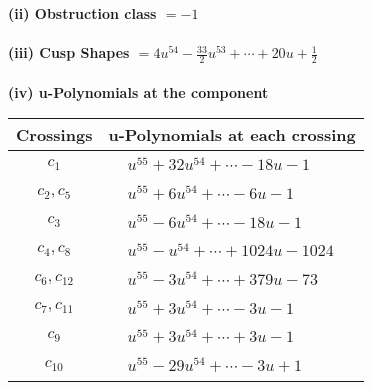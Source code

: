 \documentclass[1p]{elsarticle_modified}
\theoremstyle{definition}
\begin{document}
\flushleft \textbf{(ii) Obstruction class $= -1$}\\~\\
\flushleft \textbf{(iii) Cusp Shapes $= 4 u^{54}-\frac{33}{2} u^{53}+\cdots+20 u+\frac{1}{2}$}\\~\\
\newpage\renewcommand{\arraystretch}{1}
\flushleft \textbf{(iv) u-Polynomials at the component}\newline \\
\begin{tabular}{m{50pt}|m{274pt}}
Crossings & \hspace{64pt}u-Polynomials at each crossing \\
\hline $$\begin{aligned}c_{1}\end{aligned}$$&$\begin{aligned}
&u^{55}+32 u^{54}+\cdots-18 u-1
\end{aligned}$\\
\hline $$\begin{aligned}c_{2},c_{5}\end{aligned}$$&$\begin{aligned}
&u^{55}+6 u^{54}+\cdots-6 u-1
\end{aligned}$\\
\hline $$\begin{aligned}c_{3}\end{aligned}$$&$\begin{aligned}
&u^{55}-6 u^{54}+\cdots-18 u-1
\end{aligned}$\\
\hline $$\begin{aligned}c_{4},c_{8}\end{aligned}$$&$\begin{aligned}
&u^{55}- u^{54}+\cdots+1024 u-1024
\end{aligned}$\\
\hline $$\begin{aligned}c_{6},c_{12}\end{aligned}$$&$\begin{aligned}
&u^{55}-3 u^{54}+\cdots+379 u-73
\end{aligned}$\\
\hline $$\begin{aligned}c_{7},c_{11}\end{aligned}$$&$\begin{aligned}
&u^{55}+3 u^{54}+\cdots-3 u-1
\end{aligned}$\\
\hline $$\begin{aligned}c_{9}\end{aligned}$$&$\begin{aligned}
&u^{55}+3 u^{54}+\cdots+3 u-1
\end{aligned}$\\
\hline $$\begin{aligned}c_{10}\end{aligned}$$&$\begin{aligned}
&u^{55}-29 u^{54}+\cdots-3 u+1
\end{aligned}$\\
\hline
\end{tabular}\\~\\
\end{document}
